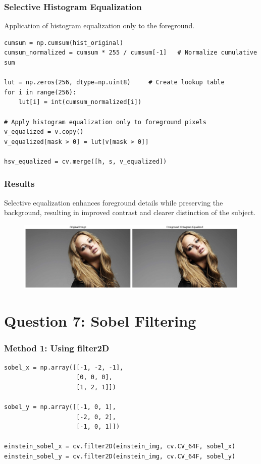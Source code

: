 \documentclass[11pt]{article}
\begin{document}
\subsubsection*{Selective Histogram Equalization}
Application of histogram equalization only to the foreground.
\begin{lstlisting}[style=pythonstyle]
cumsum = np.cumsum(hist_original)
cumsum_normalized = cumsum * 255 / cumsum[-1]   # Normalize cumulative sum

lut = np.zeros(256, dtype=np.uint8)     # Create lookup table 
for i in range(256):
    lut[i] = int(cumsum_normalized[i])
    
# Apply histogram equalization only to foreground pixels
v_equalized = v.copy()
v_equalized[mask > 0] = lut[v[mask > 0]]

hsv_equalized = cv.merge([h, s, v_equalized])
\end{lstlisting}
\newpage
\subsubsection*{Results}
Selective equalization enhances foreground details while preserving the background, resulting in improved contrast and clearer distinction of the subject.

\begin{figure}[H]
    \centering
    \includegraphics[width=0.95\linewidth]{resources/histogram_equalized_foreground.png}
    \label{fig:placeholder}
\end{figure}

\section*{Question 7: Sobel Filtering}
\subsubsection*{Method 1: Using filter2D}
\begin{lstlisting}[style=pythonstyle]
sobel_x = np.array([[-1, -2, -1],
                    [0, 0, 0],
                    [1, 2, 1]])

sobel_y = np.array([[-1, 0, 1],
                    [-2, 0, 2],
                    [-1, 0, 1]])

einstein_sobel_x = cv.filter2D(einstein_img, cv.CV_64F, sobel_x)
einstein_sobel_y = cv.filter2D(einstein_img, cv.CV_64F, sobel_y)
\end{lstlisting}
\end{document}
